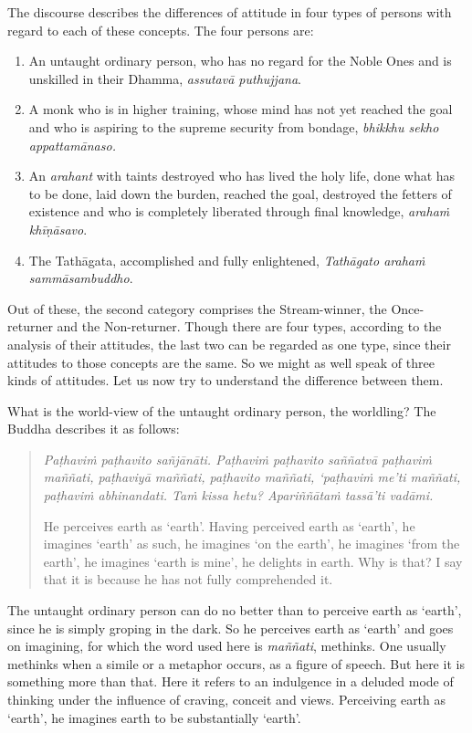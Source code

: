 The discourse describes the differences of attitude in four types of persons with regard to each of these concepts. The four persons are:

\begin{enumerate}
\def\labelenumi{\arabic{enumi}.}
\item
  An untaught ordinary person, who has no regard for the Noble Ones and is unskilled in their Dhamma, \emph{assutavā puthujjana}.
\item
  A monk who is in higher training, whose mind has not yet reached the goal and who is aspiring to the supreme security from bondage, \emph{bhikkhu sekho appattamānaso.}
\item
  An \emph{arahant} with taints destroyed who has lived the holy life, done what has to be done, laid down the burden, reached the goal, destroyed the fetters of existence and who is completely liberated through final knowledge, \emph{arahaṁ khīṇāsavo}.
\item
  The Tathāgata, accomplished and fully enlightened, \emph{Tathāgato arahaṁ sammāsambuddho}.
\end{enumerate}

Out of these, the second category comprises the Stream-winner, the Once-returner and the Non-returner. Though there are four types, according to the analysis of their attitudes, the last two can be regarded as one type, since their attitudes to those concepts are the same. So we might as well speak of three kinds of attitudes. Let us now try to understand the difference between them.

What is the world-view of the untaught ordinary person, the worldling? The Buddha describes it as follows:

\begin{quote}
\emph{Paṭhaviṁ paṭhavito sañjānāti. Paṭhaviṁ paṭhavito saññatvā paṭhaviṁ maññati, paṭhaviyā maññati, paṭhavito maññati, `paṭhaviṁ me'ti maññati, paṭhaviṁ abhinandati. Taṁ kissa hetu? Apariññātaṁ tassā'ti vadāmi.}

He perceives earth as `earth'. Having perceived earth as `earth', he imagines `earth' as such, he imagines `on the earth', he imagines `from the earth', he imagines `earth is mine', he delights in earth. Why is that? I say that it is because he has not fully comprehended it.
\end{quote}

The untaught ordinary person can do no better than to perceive earth as `earth', since he is simply groping in the dark. So he perceives earth as `earth' and goes on imagining, for which the word used here is \emph{maññati}, methinks. One usually methinks when a simile or a metaphor occurs, as a figure of speech. But here it is something more than that. Here it refers to an indulgence in a deluded mode of thinking under the influence of craving, conceit and views. Perceiving earth as `earth', he imagines earth to be substantially `earth'.

